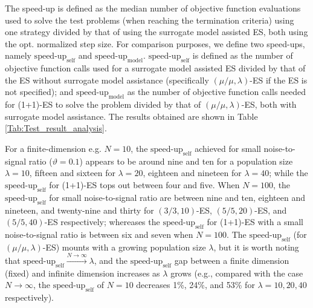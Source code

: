The speed-up is defined as the median number of objective function evaluations used to solve the test problems (when reaching the termination criteria) using one strategy divided by that of using the surrogate model assisted ES, both using the opt. normalized step size. For comparison purposes, we define two speed-ups, namely $\text{speed-up}_{\text{self}}$ and $\text{speed-up}_{\text{model}}$. $\text{speed-up}_{\text{self}}$ is defined as the number of objective function calls used for a surrogate model assisted ES divided by that of the ES without surrogate model assistance (specifically $(\mu/\mu,\lambda)$-ES if the ES is not specified); and $\text{speed-up}_{\text{model}}$ as the number of objective function calls needed for (1+1)-ES to solve the problem divided by that of $(\mu/\mu,\lambda)$-ES, both with surrogate model assistance. The results obtained are shown in Table \ref{Tab:Test_result_analysis}.




For a finite-dimension e.g. $N=10$, the $\text{speed-up}_{\text{self}}$ achieved for small noise-to-signal ratio ($\vartheta=0.1$) appears to be around nine and ten for a population size $\lambda=10$, fifteen and sixteen for $\lambda = 20$, eighteen and nineteen for $\lambda=40$; while the $\text{speed-up}_{\text{self}}$ for (1+1)-ES tops out between four and five. When $N=100$, the $\text{speed-up}_{\text{self}}$ for small noise-to-signal ratio are between nine and ten, eighteen and nineteen, and twenty-nine and thirty for $(3/3,10)$-ES, $(5/5,20)$-ES, and $(5/5,40)$-ES respectively; whereases the $\text{speed-up}_{\text{self}}$ for (1+1)-ES with a small noise-to-signal ratio is between six and seven when $N=100$. The $\text{speed-up}_{\text{self}}$ (for $(\mu/\mu,\lambda)$-ES) mounts with a growing population size $\lambda$, but it is worth noting that $\text{speed-up}_{\text{self}} \overset{N \rightarrow \infty}{\rightarrow} \lambda$, and the $\text{speed-up}_{\text{self}}$ gap between a finite dimension (fixed) and infinite dimension increases as $\lambda$ grows (e.g., compared with the case $N\rightarrow \infty$, the $\text{speed-up}_{\text{self}}$ of $N=10$ decreases 1\%, 24\%, and 53\% for $\lambda=10,20,40$ respectively).  


